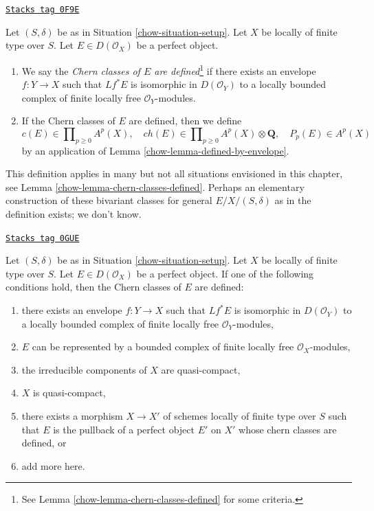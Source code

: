 \begin{definition}
\label{chow-definition-defined-on-perfect}
\href{https://stacks.math.columbia.edu/tag/0F9E}{\texttt{Stacks tag 0F9E}}

Let $(S, \delta)$ be as in Situation \ref{chow-situation-setup}.
Let $X$ be locally of finite type over $S$. Let $E \in D(\mathcal{O}_X)$
be a perfect object.
\begin{enumerate}
\item We say the {\it Chern classes of $E$ are defined}\footnote{See
Lemma \ref{chow-lemma-chern-classes-defined} for some criteria.} if there exists
an envelope $f : Y \to X$ such that $Lf^*E$ is isomorphic in
$D(\mathcal{O}_Y)$ to a locally bounded complex of finite locally free
$\mathcal{O}_Y$-modules.
\item If the Chern classes of $E$ are defined, then we define
$$
c(E) \in \prod\nolimits_{p \geq 0} A^p(X),\quad
ch(E) \in
\prod\nolimits_{p \geq 0} A^p(X) \otimes \mathbf{Q},\quad
P_p(E) \in A^p(X)
$$
by an application of Lemma \ref{chow-lemma-defined-by-envelope}.
\end{enumerate}
\end{definition}

This definition applies in many but not all situations envisioned
in this chapter, see Lemma \ref{chow-lemma-chern-classes-defined}.
Perhaps an elementary construction of these bivariant classes for general
$E/X/(S,\delta)$ as in the definition exists; we don't know.

\begin{lemma}
\label{chow-lemma-chern-classes-defined}
\href{https://stacks.math.columbia.edu/tag/0GUE}{\texttt{Stacks tag 0GUE}}

Let $(S, \delta)$ be as in Situation \ref{chow-situation-setup}.
Let $X$ be locally of finite type over $S$. Let $E \in D(\mathcal{O}_X)$
be a perfect object. If one of the following conditions hold, then
the Chern classes of $E$ are defined:
\begin{enumerate}
\item there exists an envelope $f : Y \to X$ such that $Lf^*E$
is isomorphic in $D(\mathcal{O}_Y)$ to a locally bounded complex of finite
locally free $\mathcal{O}_Y$-modules,
\item $E$ can be represented by a bounded complex of finite locally
free $\mathcal{O}_X$-modules,
\item the irreducible components of $X$ are quasi-compact,
\item $X$ is quasi-compact,
\item there exists a morphism $X \to X'$ of schemes locally of finite type
over $S$ such that $E$ is the pullback of a perfect object $E'$ on $X'$
whose chern classes are defined, or
\item add more here.
\end{enumerate}
\end{lemma}

